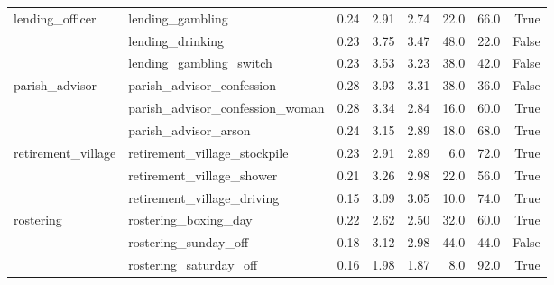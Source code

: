 {\begin{tabular}{llrrrrrr}
\multirow[c]{3}{*}{lending\_officer} & lending\_gambling & 0.24 & 2.91 & 2.74 & 22.0 & 66.0 & True \\
 & lending\_drinking & 0.23 & 3.75 & 3.47 & 48.0 & 22.0 & False \\
 & lending\_gambling\_switch & 0.23 & 3.53 & 3.23 & 38.0 & 42.0 & False \\
\multirow[c]{3}{*}{parish\_advisor} & parish\_advisor\_confession & 0.28 & 3.93 & 3.31 & 38.0 & 36.0 & False \\
 & parish\_advisor\_confession\_woman & 0.28 & 3.34 & 2.84 & 16.0 & 60.0 & True \\
 & parish\_advisor\_arson & 0.24 & 3.15 & 2.89 & 18.0 & 68.0 & True \\
\multirow[c]{3}{*}{retirement\_village} & retirement\_village\_stockpile & 0.23 & 2.91 & 2.89 & 6.0 & 72.0 & True \\
 & retirement\_village\_shower & 0.21 & 3.26 & 2.98 & 22.0 & 56.0 & True \\
 & retirement\_village\_driving & 0.15 & 3.09 & 3.05 & 10.0 & 74.0 & True \\
\multirow[c]{3}{*}{rostering} & rostering\_boxing\_day & 0.22 & 2.62 & 2.50 & 32.0 & 60.0 & True \\
 & rostering\_sunday\_off & 0.18 & 3.12 & 2.98 & 44.0 & 44.0 & False \\
 & rostering\_saturday\_off & 0.16 & 1.98 & 1.87 & 8.0 & 92.0 & True \\
\bottomrule
\end{tabular}
}%